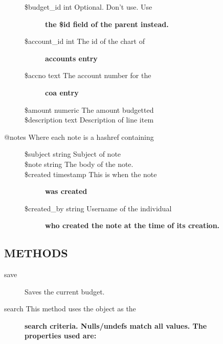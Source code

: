 \begin{description}
\begin{description}
\begin{description}
\item[{\$budget\_id int Optional. Don't use. Use}] \textbf{the \$id field of the parent instead.}
\item[{\$account\_id int The id of the chart of}] \textbf{accounts entry}
\item[{\$accno text The account number for the}] \textbf{coa entry}
\item[{\$amount numeric The amount budgetted}] \mbox{}
\item[{\$description text Description of line item}] \mbox{}\end{description}

\item[{@notes Where each note is a hashref containing}] \mbox{}\begin{description}

\item[{\$subject string
   Subject of note}] \mbox{}
\item[{\$note string
   The body of the note.}] \mbox{}
\item[{\$created timestamp This is when the note}] \textbf{was created}
\item[{\$created\_by string Username of the individual}] \textbf{who created the note at the time of its creation.}\end{description}
\end{description}
\subsection*{METHODS\label{LedgerSMB::DBObject::Budget_METHODS}}
\begin{description}

\item[{save}] \mbox{}

Saves the current budget.


\item[{}] \mbox{}
\item[{search This method uses the object as the}] \textbf{search criteria. Nulls/undefs match all values. The properties used are:}\begin{description}


\end{description}
\end{description}
\end{description}
